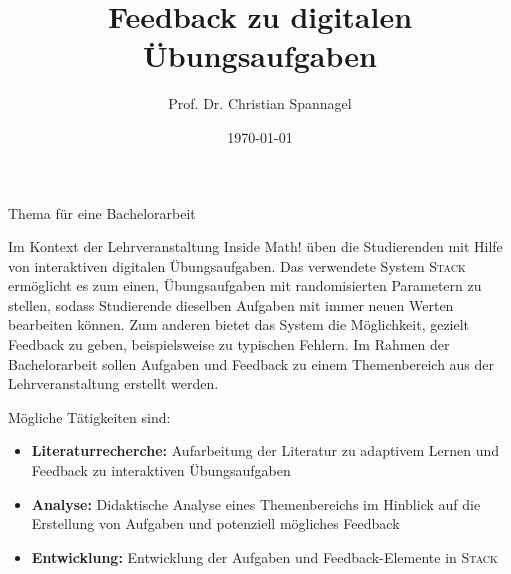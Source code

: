 \documentclass{cssheet}
\title{Feedback zu digitalen Übungsaufgaben}
\author{Prof. Dr. Christian Spannagel}
\date{\today}
\begin{document}
\vspace*{5mm}
\begin{center}
{\Large Thema für eine Bachelorarbeit}
\end{center}

\printtitle
\vspace*{1cm}

Im Kontext der Lehrveranstaltung \glqq{}Inside Math!\grqq{} üben die Studierenden mit Hilfe von interaktiven digitalen Übungsaufgaben. Das verwendete System \textsc{Stack} ermöglicht es zum einen, Übungsaufgaben mit randomisierten Parametern zu stellen, sodass Studierende dieselben Aufgaben mit immer neuen Werten bearbeiten können. Zum anderen bietet das System die Möglichkeit, gezielt Feedback zu geben, beispielsweise zu typischen Fehlern. Im Rahmen der Bachelorarbeit sollen Aufgaben und Feedback zu einem Themenbereich aus der Lehrveranstaltung erstellt werden.

Mögliche Tätigkeiten sind:
\begin{itemize}
\item \textbf{Literaturrecherche:} Aufarbeitung der Literatur zu adaptivem Lernen und Feedback zu interaktiven Übungsaufgaben
\item \textbf{Analyse:} Didaktische Analyse eines Themenbereichs im Hinblick auf die Erstellung von Aufgaben und potenziell mögliches Feedback
\item \textbf{Entwicklung:} Entwicklung der Aufgaben und Feedback-Elemente in \textsc{Stack}
\end{itemize}

\vspace*{10mm}

\printlicense

\printsocials
\end{document}
